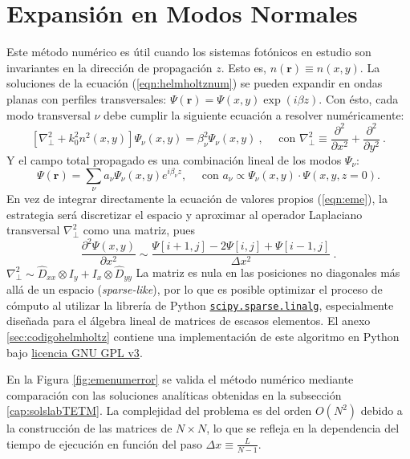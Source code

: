 \section{Expansión en Modos Normales \label{cap:eme}}
Este método numérico es útil cuando los sistemas fotónicos en estudio son invariantes en la dirección de propagación $z$. Esto es, $n(\textbf{r})\equiv n(x,y)$. La soluciones de la ecuación (\ref{eqn:helmholtznum}) se pueden expandir en ondas planas con perfiles transversales: $\Psi(\textbf{r}) = \Psi(x,y) \exp({i\beta z})$. Con ésto, cada modo transversal $\nu$ debe cumplir la siguiente ecuación a resolver numéricamente:
\begin{equation}
	\left[\nabla_\perp^2 + k_0^2 n^2(x,y)\right]\Psi_\nu(x,y) = \beta_\nu^2\Psi_\nu(x,y) \ , \quad\text{ con } \nabla_\perp^2 \equiv \frac{\partial^2}{\partial x^2} + \frac{\partial^2}{\partial y^2} \ .
	\label{eqn:eme}
\end{equation}
Y el campo total propagado es una combinación lineal de los modos $\Psi_\nu$: 
\begin{equation}
	\Psi(\textbf{r}) = \sum_\nu a_\nu \Psi_\nu(x,y) e^{i\beta_\nu z}, \quad\text{ con } a_\nu \propto \Psi_\nu(x,y) \cdot \Psi(x, y, z=0). \label{eqn:emedin}
\end{equation}
En vez de integrar directamente la ecuación de valores propios (\ref{eqn:eme}), la estrategia será discretizar el espacio y aproximar al operador Laplaciano transversal $\nabla_\perp^2$ como una matriz, pues $$\frac{\partial^2 \Psi(x,y)}{\partial x^2} \sim \frac{\Psi[i+1,j]-2\Psi[i,j]+\Psi[i-1,j]}{\Delta x ^2}  \ .
$$
$\nabla^2_\perp \sim \hat{D}_{xx} \otimes I_y + I_x \otimes \hat{D}_{yy}$
La matriz es nula en las posiciones no diagonales más allá de un espacio (\textit{sparse-like}), por lo que es posible optimizar el proceso de cómputo al utilizar la librería de Python \href{https://docs.scipy.org/doc/scipy/reference/sparse.linalg.html}{\color{magenta}\texttt{scipy.sparse.linalg}}, especialmente diseñada para el álgebra lineal de matrices de escasos elementos. El anexo \ref{sec:codigohelmholtz} contiene una implementación de este algoritmo en Python bajo \href{https://www.gnu.org/licenses/gpl-3.0.html}{\color{magenta}licencia GNU GPL v3}.

En la Figura \ref{fig:emenumerror} se valida el método numérico mediante comparación con las soluciones analíticas obtenidas en la subsección \ref{cap:solslabTETM}. La complejidad del problema es del orden $O(N^2)$ debido a la construcción de las matrices de $N\times N$, lo que se refleja en la dependencia del tiempo de ejecución en función del paso $\Delta x \equiv \frac{L}{N-1}$.


